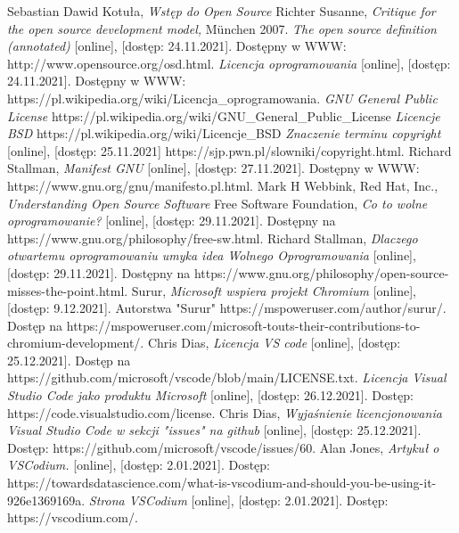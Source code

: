 \documentclass{article}
\begin{document}
\newpage
\begin{thebibliography}{99}
    Sebastian Dawid Kotuła,
    \emph{Wstęp do Open Source}
  Richter Susanne, \emph{Critique for the open source development model,} München 2007.
  \emph{The open source definition (annotated)} [online], [dostęp: 24.11.2021]. Dostępny w WWW: http://www.opensource.org/osd.html.
  \emph{Licencja oprogramowania} [online], [dostęp: 24.11.2021]. Dostępny w WWW: https://pl.wikipedia.org/wiki/Licencja\_oprogramowania.
  \emph{GNU General Public License} https://pl.wikipedia.org/wiki/GNU\_General\_Public\_License
  \emph{Licencje BSD} https://pl.wikipedia.org/wiki/Licencje\_BSD
  \emph{Znaczenie terminu copyright} [online], [dostęp: 25.11.2021] https://sjp.pwn.pl/slowniki/copyright.html.
  Richard Stallman, \emph{Manifest GNU} [online], [dostęp: 27.11.2021]. Dostępny w WWW: https://www.gnu.org/gnu/manifesto.pl.html.
  Mark H Webbink, Red Hat, Inc., \emph{Understanding Open Source Software}
  Free Software Foundation, \emph{Co to wolne oprogramowanie?} [online], [dostęp: 29.11.2021]. Dostępny na https://www.gnu.org/philosophy/free-sw.html.
  Richard Stallman, \emph{Dlaczego otwartemu oprogramowaniu umyka idea Wolnego Oprogramowania} [online], [dostęp: 29.11.2021]. Dostępny na https://www.gnu.org/philosophy/open-source-misses-the-point.html.
  Surur, \emph{Microsoft wspiera projekt Chromium} [online], [dostęp: 9.12.2021]. Autorstwa "Surur" https://mspoweruser.com/author/surur/. 
  Dostęp na https://mspoweruser.com/microsoft-touts-their-contributions-to-chromium-development/.
    Chris Dias, \emph{Licencja VS code} [online], [dostęp: 25.12.2021].
    Dostęp na https://github.com/microsoft/vscode/blob/main/LICENSE.txt.
    \emph{Licencja Visual Studio Code jako produktu Microsoft} [online], [dostęp: 26.12.2021].
    Dostęp: https://code.visualstudio.com/license.
    Chris Dias, \emph{Wyjaśnienie licencjonowania Visual Studio Code w sekcji "issues" na github} [online], [dostęp: 25.12.2021].
    Dostęp: https://github.com/microsoft/vscode/issues/60.    
    Alan Jones, \emph{Artykuł o VSCodium.} [online], [dostęp: 2.01.2021].
    Dostęp: https://towardsdatascience.com/what-is-vscodium-and-should-you-be-using-it-926e1369169a.
    \emph{Strona VSCodium} [online], [dostęp: 2.01.2021].
    Dostęp: https://vscodium.com/.
\end{thebibliography}
\end{document}
